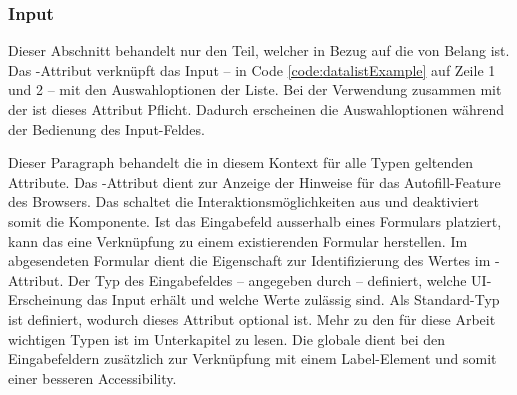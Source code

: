 \subsubsection{\color{dblue} \color{dgray} Input}
\label{sec:input}

Dieser Abschnitt behandelt nur den Teil, welcher in Bezug auf die  von Belang ist. 
Das -Attribut verknüpft das Input – in Code \ref{code:datalistExample} auf Zeile 1 und 2 – mit den Auswahloptionen der Liste. 
Bei der Verwendung zusammen mit der  ist dieses Attribut Pflicht. 
Dadurch erscheinen die Auswahloptionen während der Bedienung des Input-Feldes. 

Dieser Paragraph behandelt die in diesem Kontext für alle Typen geltenden Attribute. 
Das -Attribut dient zur Anzeige der Hinweise für das Autofill-Feature des Browsers. 
Das  schaltet die Interaktionsmöglichkeiten aus und deaktiviert somit die Komponente. 
Ist das Eingabefeld ausserhalb eines Formulars platziert, kann das  eine Verknüpfung zu einem existierenden Formular herstellen. 
Im abgesendeten Formular dient die Eigenschaft  zur Identifizierung des Wertes im -Attribut. 
Der Typ des Eingabefeldes – angegeben durch  – definiert, welche UI-Erscheinung das Input erhält und welche Werte zulässig sind. 
Als Standard-Typ ist  definiert, wodurch dieses Attribut optional ist. 
Mehr zu den für diese Arbeit wichtigen Typen ist im Unterkapitel \textbf{} zu lesen. 
Die globale  dient bei den Eingabefeldern zusätzlich zur Verknüpfung mit einem Label-Element und somit einer besseren Accessibility. 

